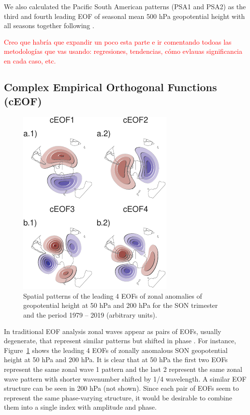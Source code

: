 \documentclass[smallextended]{svjour3}       %
\begin{document}
We also calculated the Pacific South American patterns (PSA1 and PSA2) as the third and fourth leading EOF of seasonal mean 500 hPa geopotential height with all seasons together following \citet{mo2001}.

\textcolor{red}{Creo que habría que expandir un poco esta parte e ir comentando todoas las metodologías que vas usando: regresiones, tendencias, cómo evlauas significancia en cada caso, etc. }

\hypertarget{complex-empirical-orthogonal-functions-ceof}{%
\subsection{Complex Empirical Orthogonal Functions (cEOF)}\label{complex-empirical-orthogonal-functions-ceof}}



\begin{figure}
\centering
\includegraphics{../figures/eof-naive-1.pdf}
\caption{\label{fig:eof-naive}Spatial patterns of the leading 4 EOFs of zonal anomalies of geopotential height at 50 hPa and 200 hPa for the SON trimester and the period 1979 -- 2019 (arbitrary units).}
\end{figure}

In traditional EOF analysis zonal waves appear as pairs of EOFs, usually degenerate, that represent similar patterns but shifted in phase \citep{horel1984}. For instance, Figure~\ref{fig:eof-naive} shows the leading 4 EOFs of zonally anomalous SON geopotential height at 50 hPa and 200 hPa. It is clear that at 50 hPa the first two EOFs represent the same zonal wave 1 pattern and the last 2 represent the same zonal wave pattern with shorter wavenumber shifted by 1/4 wavelength. A similar EOF structure can be seen in 200 hPa (not shown). Since each pair of EOFs seem to represent the same phase-varying structure, it would be desirable to combine them into a single index with amplitude and phase.
\end{document}
